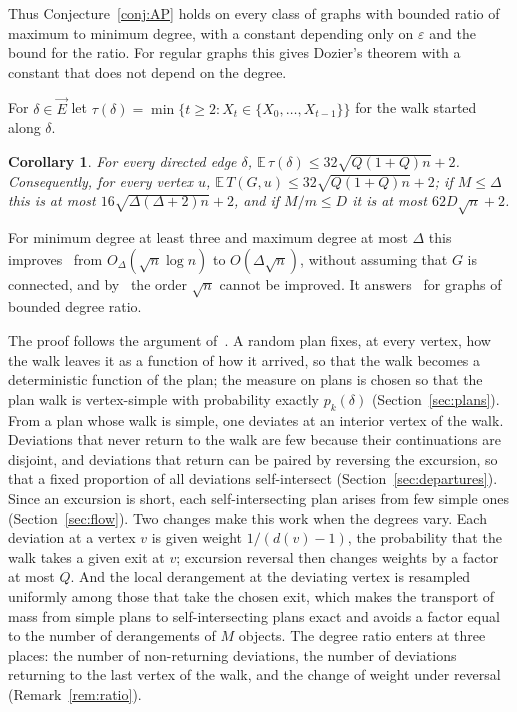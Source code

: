 \documentclass[11pt]{amsart}
\newtheorem{corollary}[theorem]{Corollary}
\theoremstyle{remark}
\newcommand{\E}{\mathbb{E}}
\newcommand{\vE}{\vec{E}}
\begin{document}
Thus Conjecture~\ref{conj:AP} holds on every class of graphs with bounded ratio of maximum to minimum degree, with a
constant depending only on $\varepsilon$ and the bound for the ratio. For regular graphs this gives Dozier's theorem
with a constant that does not depend on the degree.

For $\delta\in\vE$ let $\tau(\delta)=\min\{t\ge2:X_t\in\{X_0,\dots,X_{t-1}\}\}$ for the walk started along $\delta$.

\begin{corollary}\label{cor:expectation}
For every directed edge $\delta$, $\E\,\tau(\delta)\le32\sqrt{Q(1+Q)n}+2$. Consequently, for every vertex $u$,
$\E\,T(G,u)\le32\sqrt{Q(1+Q)n}+2$; if $M\le\Delta$ this is at most $16\sqrt{\Delta(\Delta+2)n}+2$, and if
$M/m\le D$ it is at most $62D\sqrt n+2$.
\end{corollary}

For minimum degree at least three and maximum degree at most $\Delta$ this improves~\cite[Theorem~1]{BGJ26} from
$O_\Delta(\sqrt n\log n)$ to $O(\Delta\sqrt n)$, without assuming that $G$ is connected, and by~\cite[Theorem~3]{BGJ26}
the order $\sqrt n$ cannot be improved. It answers~\cite[Question~4]{BGJ26} for graphs of bounded degree ratio.

The proof follows the argument of~\cite{Doz26}. A random plan fixes, at every vertex, how the walk leaves it as a
function of how it arrived, so that the walk becomes a deterministic function of the plan; the measure on plans is
chosen so that the plan walk is vertex-simple with probability exactly $p_k(\delta)$ (Section~\ref{sec:plans}). From a
plan whose walk is simple, one deviates at an interior vertex of the walk. Deviations that never return to the walk are
few because their continuations are disjoint, and deviations that return can be paired by reversing the excursion, so
that a fixed proportion of all deviations self-intersect (Section~\ref{sec:departures}). Since an excursion is short,
each self-intersecting plan arises from few simple ones (Section~\ref{sec:flow}). Two changes make this work when the
degrees vary. Each deviation at a vertex $v$ is given weight $1/(d(v)-1)$, the probability that the walk takes a given
exit at $v$; excursion reversal then changes weights by a factor at most $Q$. And the local derangement at the
deviating vertex is resampled uniformly among those that take the chosen exit, which makes the transport of mass from
simple plans to self-intersecting plans exact and avoids a factor equal to the number of derangements of $M$ objects.
The degree ratio enters at three places: the number of non-returning deviations, the number of deviations returning to
the last vertex of the walk, and the change of weight under reversal (Remark~\ref{rem:ratio}).
\end{document}
